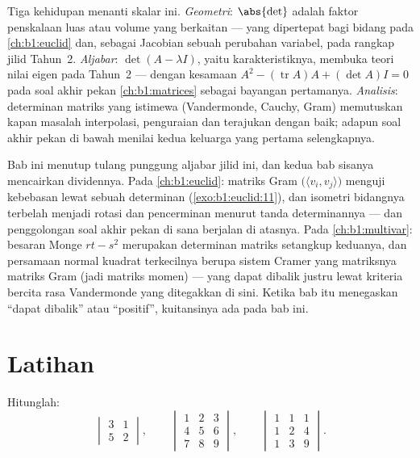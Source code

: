 \begin{remark}
\label{rem:b1:det:whereused}
Tiga kehidupan menanti skalar ini. \emph{Geometri}: $\abs{\det}$ adalah
faktor penskalaan luas atau volume  yang berkaitan --- yang dipertepat
bagi bidang pada \cref{ch:b1:euclid} dan, sebagai Jacobian
sebuah perubahan variabel, pada  rangkap jilid
Tahun~2. \emph{Aljabar}: $\det(A - \lambda I)$, yaitu
 karakteristiknya, membuka teori nilai eigen pada Tahun~2 ---
dengan kesamaan $A^2 - (\operatorname{tr} A)A + (\det A)I = 0$ pada
soal akhir pekan \cref{ch:b1:matrices} sebagai bayangan pertamanya.
\emph{Analisis}: determinan matriks yang istimewa (Vandermonde,
Cauchy, Gram) memutuskan kapan masalah interpolasi, penguraian dan
 terajukan dengan baik; adapun soal akhir pekan di bawah
menilai kedua keluarga yang pertama selengkapnya.
\end{remark}

\begin{remark}
\label{rem:b1:det:perspectives}
Bab ini menutup tulang punggung aljabar  jilid ini, dan
kedua bab sisanya mencairkan dividennya. Pada
\cref{ch:b1:euclid}: matriks Gram
$\bigl(\langle v_i, v_j\rangle\bigr)$ menguji kebebasan lewat sebuah
determinan (\cref{exo:b1:euclid:11}), dan isometri bidangnya
terbelah menjadi rotasi dan pencerminan menurut tanda
determinannya --- dan penggolongan soal akhir pekan di sana
berjalan di atasnya. Pada \cref{ch:b1:multivar}: besaran Monge $rt -
s^2$ merupakan determinan matriks setangkup 
keduanya, dan persamaan normal kuadrat terkecilnya berupa
sistem Cramer yang matriksnya matriks Gram (jadi matriks momen) ---
yang dapat dibalik justru lewat kriteria bercita rasa Vandermonde
yang ditegakkan di sini. Ketika bab itu menegaskan ``dapat dibalik'' atau
``positif'', kuitansinya ada pada bab ini.
\end{remark}

\section{Latihan}

\begin{exercise}[$\star$]\label{exo:b1:det:1}
Hitunglah:
\[
\begin{vmatrix} 3 & 1\\ 5 & 2 \end{vmatrix},
\qquad
\begin{vmatrix} 1 & 2 & 3\\ 4 & 5 & 6\\ 7 & 8 & 9\end{vmatrix},
\qquad
\begin{vmatrix} 1 & 1 & 1\\ 1 & 2 & 4\\ 1 & 3 & 9\end{vmatrix}.
\]
\end{exercise}

